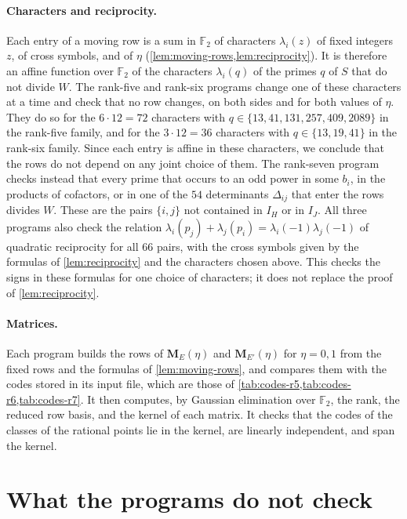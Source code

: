 \documentclass[12pt,oneside,openany]{book}
\theoremstyle{definition}
\theoremstyle{plain}
\numberwithin{equation}{chapter}
\theoremstyle{plain}
\theoremstyle{definition}
\theoremstyle{remark}
\newcommand{\F}{\mathbb F}
\begin{document}
\paragraph{Characters and reciprocity.} Each entry of a moving row is a sum in $\F_2$ of characters $\lambda_i(z)$ of fixed integers $z$, of cross symbols, and of $\eta$ (\cref{lem:moving-rows,lem:reciprocity}). It is therefore an affine function over $\F_2$ of the characters $\lambda_i(q)$ of the primes $q$ of $S$ that do not divide $W$. The rank-five and rank-six programs change one of these characters at a time and check that no row changes, on both sides and for both values of $\eta$. They do so for the $6\cdot12=72$ characters with $q\in\{13,41,131,257,409,2089\}$ in the rank-five family, and for the $3\cdot12=36$ characters with $q\in\{13,19,41\}$ in the rank-six family. Since each entry is affine in these characters, we conclude that the rows do not depend on any joint choice of them. The rank-seven program checks instead that every prime that occurs to an odd power in some $b_i$, in the products of cofactors, or in one of the $54$ determinants $\Delta_{ij}$ that enter the rows divides $W$. These are the pairs $\{i,j\}$ not contained in $I_H$ or in $I_J$. All three programs also check the relation $\lambda_i(p_j)+\lambda_j(p_i)=\lambda_i(-1)\lambda_j(-1)$ of quadratic reciprocity for all $66$ pairs, with the cross symbols given by the formulas of \cref{lem:reciprocity} and the characters chosen above. This checks the signs in these formulas for one choice of characters; it does not replace the proof of \cref{lem:reciprocity}.

\paragraph{Matrices.} Each program builds the rows of $\mathbf M_E(\eta)$ and $\mathbf M_{E'}(\eta)$ for $\eta=0,1$ from the fixed rows and the formulas of \cref{lem:moving-rows}, and compares them with the codes stored in its input file, which are those of \cref{tab:codes-r5,tab:codes-r6,tab:codes-r7}. It then computes, by Gaussian elimination over $\F_2$, the rank, the reduced row basis, and the kernel of each matrix. It checks that the codes of the classes of the rational points lie in the kernel, are linearly independent, and span the kernel.

\section{What the programs do not check}\label{sec:verification-limits}
\end{document}
